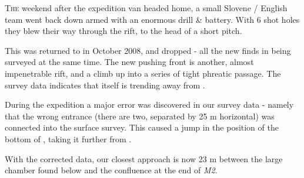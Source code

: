 \thispagestyle{endchapter}

\begin{tcolorbox}

\vspace{80pt}
	\lettrine{T}{he} weekend after the expedition van headed home, a small Slovene /
English team went back down  armed with an enormous drill \&
battery. With 6 shot holes they blew their way through the rift, to the
head of a short pitch.

This was returned to in October 2008, and dropped - all the new finds in
 being surveyed at the same time. The new pushing front is
another, almost impenetrable rift, and a climb up into a series of tight
phreatic passage. The survey data indicates that  itself is
trending away from .

During the expedition a
major error was discovered in our survey data - namely that the wrong
 entrance (there are two, separated by 25 m horizontal) was
connected into the surface survey. This caused a jump in the position of
the bottom of , taking it further from .

With the corrected data, our closest approach is now 23 m between the
large chamber found below  and the confluence at the end of
\emph{M2}.

\end{tcolorbox} 
\BgThispage
